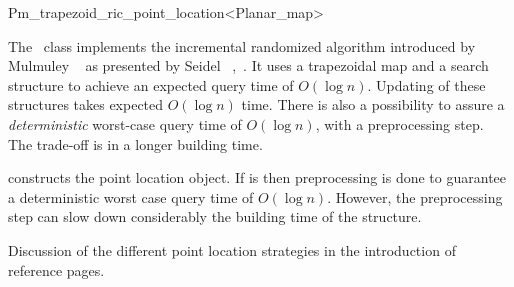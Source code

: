 
\ccRefPageBegin



\renewcommand{\ccRefPageBegin}{\begin{ccAdvanced}}
\renewcommand{\ccRefPageEnd}{\end{ccAdvanced}}

\begin{ccRefClass}{Pm_trapezoid_ric_point_location<Planar_map>}
\label{PL_sec:default}

\ccDefinition
The \ccRefName\ class
implements the incremental randomized algorithm introduced by
Mulmuley ~\cite{m-fppa-90} as presented by Seidel ~\cite{s-sfira-91},~\cite{bkos-cgaa-97}.
It uses a trapezoidal map and a search structure to 
achieve an expected query time of $O(\log n)$.
Updating of these structures takes expected $O(\log n)$ time. 
There is also a possibility to assure a {\em deterministic} worst-case query 
time  of $O(\log n)$, with a preprocessing step. The trade-off is in a longer
building time.

\ccThreeToTwo



\ccIsModel

\ccInheritsFrom

\ccCreation

{ constructs the point location object. If  is  then
preprocessing is done to guarantee a deterministic worst case query time of
$O(\log n)$. However, the preprocessing step can slow down considerably
the building time of the structure.}

\ccSeeAlso
   Discussion of the different point location strategies in the introduction
of  reference pages.

\end{ccRefClass}
\renewcommand{\ccRefPageBegin}{}
\renewcommand{\ccRefPageEnd}{}

\ccRefPageEnd
